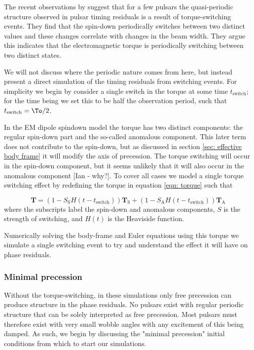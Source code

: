 The recent observations by \citet{Lyne2010} suggest that for a few pulsars the
quasi-periodic structure observed in pulsar timing residuals is a result of 
torque-switching events. They find that the spin-down periodically switches
between two distinct values and these changes correlate with changes in the beam
width. They argue this indicates that the electromagnetic torque is periodically
switching between two distinct states. 

We will not discuss where the periodic nature comes from here, but instead
present a direct simulation of the timing residuals from switching events. For
simplicity we begin by consider a single switch in the torque at some time
$t_{\mathrm{switch}}$; for the time being we set this to be half the
observation period, such that $t_{\mathrm{switch}} = \To/2$.

In the EM dipole spindown model the torque has two distinct components: the
regular spin-down part and the so-called anomalous component. This later term 
does not contribute to the spin-down, but as discussed in section \ref{sec: effective
body frame} it will modify the axis of precession. The torque switching will 
occur in the spin-down component, but it seems unlikely that it will also
occur in the anomalous component [Ian - why?]. To cover all cases we 
model a single torque switching effect by redefining the torque in equation
\eqref{eqn: torque} such that

\newcommand{\Ss}{S_{\mathrm{S}}}
\newcommand{\Sa}{S_{\mathrm{A}}}

\begin{equation}
\mathbf{T} = (1 - \Ss H(t-t_{\mathrm{switch}})) \mathbf{T}_{\mathrm{S}}+
                 (1 - \Sa H(t-t_{\mathrm{switch}})) \mathbf{T}_{\mathrm{A}}
\label{eqn: single switch torque}
\end{equation} 
where the subscripts label the spin-down and anomalous components, $S$ is the
strength of switching, and $H(t)$ is the Heaviside function. 

Numerically solving the body-frame and Euler equations using this torque we 
simulate a single switching event to try and understand the effect it will have
on phase residuals. 

\subsubsection{Minimal precession}
Without the torque-switching, in these simulations only free precession can 
produce structure in the phase residuals. No pulsars exist with regular periodic
structure that can be solely interpreted as free precession. Most pulsars must 
therefore exist with very small wobble angles with any excitement of this being
damped. As such, we begin by discussing the "minimal precession" initial 
conditions from which to start our simulations. 


